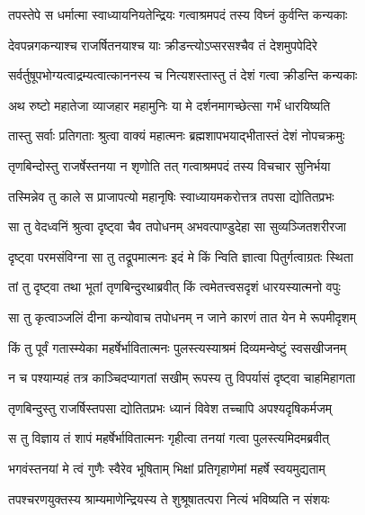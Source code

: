 \twolineshloka
{तपस्तेपे स धर्मात्मा स्वाध्यायनियतेन्द्रियः}
{गत्वाश्रमपदं तस्य विघ्नं कुर्वन्ति कन्यकाः} %

\twolineshloka
{देवपन्नगकन्याश्च राजर्षितनयाश्च याः}
{क्रीडन्त्योऽप्सरसश्चैव तं देशमुपपेदिरे} %

\twolineshloka
{सर्वर्तुषूपभोग्यत्वाद्रम्यत्वात्काननस्य च}
{नित्यशस्तास्तु तं देशं गत्वा क्रीडन्ति कन्यकाः} %

\twolineshloka
{अथ रुष्टो महातेजा व्याजहार महामुनिः}
{या मे दर्शनमागच्छेत्सा गर्भं धारयिष्यति} %

\twolineshloka
{तास्तु सर्वाः प्रतिगताः श्रुत्वा वाक्यं महात्मनः}
{ब्रह्मशापभयाद्भीतास्तं देशं नोपचक्रमुः} %

\twolineshloka
{तृणबिन्दोस्तु राजर्षेस्तनया न शृणोति तत्}
{गत्वाश्रमपदं तस्य विचचार सुनिर्भया} %

\twolineshloka
{तस्मिन्नेव तु काले स प्राजापत्यो महानृषिः}
{स्वाध्यायमकरोत्तत्र तपसा द्योतितप्रभः} %

\twolineshloka
{सा तु वेदध्वनिं श्रुत्वा दृष्ट्वा चैव तपोधनम्}
{अभवत्पाण्डुदेहा सा सुव्यञ्जितशरीरजा} %

\twolineshloka
{दृष्ट्वा परमसंविग्ना सा तु तद्रूपमात्मनः}
{इदं मे किं न्विति ज्ञात्वा पितुर्गत्वाग्रतः स्थिता} %

\twolineshloka
{तां तु दृष्ट्वा तथा भूतां तृणबिन्दुरथाब्रवीत्}
{किं त्वमेतत्त्वसदृशं धारयस्यात्मनो वपुः} %

\twolineshloka
{सा तु कृत्वाञ्जलिं दीना कन्योवाच तपोधनम्}
{न जाने कारणं तात येन मे रूपमीदृशम्} %

\twolineshloka
{किं तु पूर्वं गतास्म्येका महर्षेर्भावितात्मनः}
{पुलस्त्यस्याश्रमं दिव्यमन्वेष्टुं स्वसखीजनम्} %

\twolineshloka
{न च पश्याम्यहं तत्र काञ्चिदप्यागतां सखीम्}
{रूपस्य तु विपर्यासं दृष्ट्वा चाहमिहागता} %

\twolineshloka
{तृणबिन्दुस्तु राजर्षिस्तपसा द्योतितप्रभः}
{ध्यानं विवेश तच्चापि अपश्यदृषिकर्मजम्} %

\twolineshloka
{स तु विज्ञाय तं शापं महर्षेर्भावितात्मनः}
{गृहीत्वा तनयां गत्वा पुलस्त्यमिदमब्रवीत्} %

\twolineshloka
{भगवंस्तनयां मे त्वं गुणैः स्वैरेव भूषिताम्}
{भिक्षां प्रतिगृहाणेमां महर्षे स्वयमुद्यताम्} %

\twolineshloka
{तपश्चरणयुक्तस्य श्राम्यमाणेन्द्रियस्य ते}
{शुश्रूषातत्परा नित्यं भविष्यति न संशयः} %


